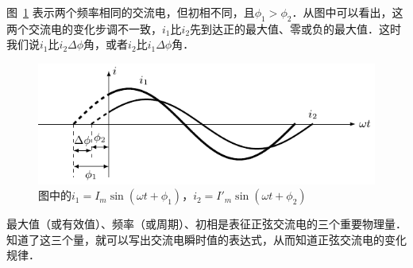 图~\ref{fig_C_3-8} 表示两个频率相同的交流电，但初相不同，且$\phi_1>\phi_2$．从图中可以看出，这两个交流电的变化步调不一致，$i_1$比$i_2$先到达正的最大值、零或负的最大值．这时我们说$i_1$比$i_2$$\Delta\phi$角，或者$i_2$比$i_1$$\Delta\phi$角．
\begin{figure}[htbp]
    \centering
    \includegraphics{fig/C/3-8.pdf}
    \caption{图中的$i_1=I_m\sin(\omega t+\phi_1)$，$i_2=I'_m\sin(\omega t+\phi_2)$}\label{fig_C_3-8}
\end{figure}

最大值（或有效值）、频率（或周期）、初相是表征正弦交流电的三个重要物理量．
知道了这三个量，就可以写出交流电瞬时值的表达式，从而知道正弦交流电的变化规律．

